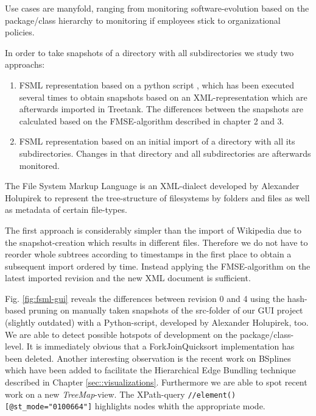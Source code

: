 Use cases are manyfold, ranging from monitoring software-evolution based on the package/class hierarchy to monitoring if employees stick to organizational policies.

In order to take snapshots of a directory with all subdirectories we study two approachs:

\begin{enumerate}
\item FSML representation based on a python script \cite{FSML}, which has been executed several times to obtain snapshots based on an XML-representation which are afterwards imported in Treetank. The differences between the snapshots are calculated based on the FMSE-algorithm described in chapter 2 and 3.
\item FSML representation based on an initial import of a directory with all its subdirectories. Changes in that directory and all subdirectories are afterwards monitored.
\end{enumerate}

The File System Markup Language is an XML-dialect developed by Alexander Holupirek \cite{FSML} to represent the tree-structure of filesystems by folders and files as well as metadata of certain file-types. 

The first approach is considerably simpler than the import of Wikipedia due to the snapshot-creation which results in different files. Therefore we do not have to reorder whole subtrees according to timestamps in the first place to obtain a subsequent import ordered by time. Instead applying the FMSE-algorithm on the latest imported revision and the new XML document is sufficient.

Fig. \ref{fig:fsml-gui} reveals the differences between revision 0 and 4 using the hash-based pruning on manually taken snapshots of the src-folder of our GUI project (slightly outdated) with a Python-script, developed by Alexander Holupirek, too. We are able to detect possible hotspots of development on the package/class-level. It is immediately obvious that a ForkJoinQuicksort implementation has been deleted. Another interesting observation is the recent work on BSplines which have been added to facilitate the Hierarchical Edge Bundling technique described in Chapter \ref{sec::visualizations}. Furthermore we are able to spot recent work on a new \emph{TreeMap}-view. The XPath-query \texttt{//element()[@st\_mode="0100664"]} highlights nodes whith the appropriate mode.

